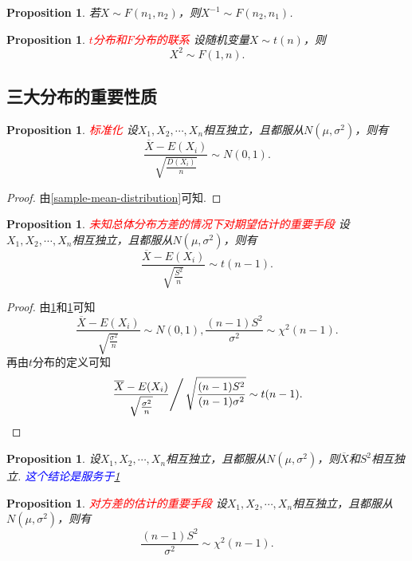 \documentclass{article}
\newtheorem{proposition}[theorem]{Proposition}
\newcommand{\redt}[1]{\textcolor{red}{#1}}
\newcommand{\bluet}[1]{\textcolor{blue}{#1}}
\begin{document}
\begin{proposition}
\rm 若$X \sim F(n_1,n_2)$，则$X^{-1} \sim F(n_2,n_1)$. 
\end{proposition}

\begin{proposition}
\rm \redt{$t$分布和$F$分布的联系} 设随机变量$X \sim t(n)$，则
$$
X^2 \sim F(1,n). 
$$
\end{proposition}

\subsection{三大分布的重要性质}

\begin{proposition}\label{sample-means-normalization}
\rm \redt{标准化} 设$X_1,X_2,\cdots,X_n$相互独立，且都服从$N(\mu,\sigma^2)$，则有
$$
\frac{\overline{X} - E(X_i)}{\sqrt{\frac{D(X_i)}{n}}} \sim N(0,1).
$$
\end{proposition}

\begin{proof}
\rm 由\ref{sample-mean-distribution}可知.
\end{proof}

\begin{proposition}\label{sample-variance-replace-variance}
\rm \redt{未知总体分布方差的情况下对期望估计的重要手段} 设$X_1,X_2,\cdots,X_n$相互独立，且都服从$N(\mu,\sigma^2)$，则有
$$
\frac{\overline{X} - E(X_i)}{\sqrt{\frac{S^2}{n}}} \sim t(n-1). 
$$
\end{proposition}

\begin{proof}
由\ref{sample-means-normalization}和\ref{sample-variance-and-variance}可知
$$
\frac{\overline{X}-E(X_i)}{\sqrt{\frac{\sigma^2}{n}}} \sim N(0,1),\frac{(n-1)S^2}{\sigma^2} \sim \chi^2(n-1).
$$
再由$t$分布的定义可知
$$
\left. \frac{\overline{X}-E(X_i)}{\sqrt{\frac{\sigma^2}{n}}} \right/ \sqrt{\frac{(n-1)S^2}{(n-1)\sigma^2}} \sim t(n-1).
$$
\end{proof}

\begin{proposition}
\rm 设$X_1,X_2,\cdots,X_n$相互独立，且都服从$N(\mu,\sigma^2)$，则$\overline{X}$和$S^2$相互独立. \bluet{这个结论是服务于\ref{sample-variance-replace-variance}}
\end{proposition}

\begin{proposition}\label{sample-variance-and-variance}
\rm \redt{对方差的估计的重要手段} 设$X_1,X_2,\cdots,X_n$相互独立，且都服从$N(\mu,\sigma^2)$，则有
$$
\frac{(n-1)S^2}{\sigma^2} \sim \chi^2(n-1). 
$$
\end{proposition}
\end{document}
